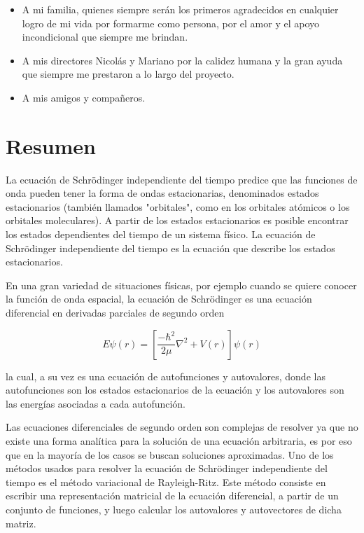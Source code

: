 \documentclass[a4paper,openright, 12pt, oneside]{book}
\begin{document}
\begin{itemize}
\item A mi familia, quienes siempre ser\'an los primeros agradecidos en
cualquier logro de mi vida por formarme como persona, por el amor y el apoyo incondicional que siempre me brindan.

\item A mis directores Nicol\'as y Mariano por la calidez humana y la gran ayuda que siempre me prestaron a lo largo del proyecto.

\item A mis amigos y compa\~neros.

\end{itemize}

\chapter*{\hspace{0.65cm}Resumen} %

La ecuaci\'on de Schr\"odinger independiente del tiempo predice que las funciones de onda pueden tener la forma de ondas estacionarias, denominados estados estacionarios (tambi\'en llamados "orbitales", como en los orbitales at\'omicos o los orbitales moleculares). A partir de los estados estacionarios es posible encontrar los estados dependientes del tiempo de un sistema f\'isico. La ecuaci\'on de Schr\"odinger independiente del tiempo es la ecuaci\'on que describe los estados estacionarios.

En una gran variedad de situaciones f\'isicas, por ejemplo cuando se quiere conocer la funci\'on de onda espacial, la ecuaci\'on de Schr\"odinger es una ecuaci\'on diferencial en derivadas parciales de segundo orden

\begin{displaymath}
    E\psi(r) = \left[\frac{-\hbar^2}{2\mu} \nabla^2 + V(r)\right]\psi(r)
\end{displaymath}

la cual, a su vez es una ecuaci\'on de autofunciones y autovalores, donde las autofunciones son los estados estacionarios de la ecuaci\'on y los autovalores son las energ\'ias asociadas a cada autofunci\'on.

Las ecuaciones diferenciales de segundo orden son complejas de resolver ya que no existe una forma anal\'itica para la soluci\'on de una ecuaci\'on arbitraria, es por eso que en la mayor\'ia de los casos se buscan soluciones aproximadas. Uno de los m\'etodos usados para resolver la ecuaci\'on de Schr\"odinger independiente del tiempo es el m\'etodo variacional de Rayleigh-Ritz. Este m\'etodo consiste en escribir una representaci\'on matricial de la ecuaci\'on diferencial, a partir de un conjunto de funciones, y luego calcular los autovalores y autovectores de dicha matriz.
\end{document}
